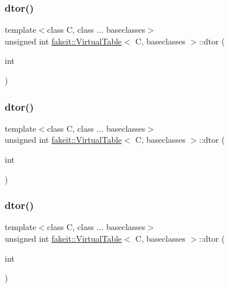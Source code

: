 \subsubsection{\texorpdfstring{dtor()}{dtor()}\hspace{0.1cm}{\footnotesize\ttfamily [6/10]}}
{\footnotesize\ttfamily template$<$class C, class ... baseclasses$>$ \\
unsigned int \mbox{\hyperlink{structfakeit_1_1VirtualTable}{fakeit\+::\+Virtual\+Table}}$<$ C, baseclasses $>$\+::dtor (\begin{DoxyParamCaption}\item[{int}]{ }\end{DoxyParamCaption})\hspace{0.3cm}{\ttfamily [inline]}}

\mbox{\label{structfakeit_1_1VirtualTable_a7be0619d713b6ae2cac5722895176a14}} 
\subsubsection{\texorpdfstring{dtor()}{dtor()}\hspace{0.1cm}{\footnotesize\ttfamily [7/10]}}
{\footnotesize\ttfamily template$<$class C, class ... baseclasses$>$ \\
unsigned int \mbox{\hyperlink{structfakeit_1_1VirtualTable}{fakeit\+::\+Virtual\+Table}}$<$ C, baseclasses $>$\+::dtor (\begin{DoxyParamCaption}\item[{int}]{ }\end{DoxyParamCaption})\hspace{0.3cm}{\ttfamily [inline]}}

\mbox{\label{structfakeit_1_1VirtualTable_a7be0619d713b6ae2cac5722895176a14}} 
\subsubsection{\texorpdfstring{dtor()}{dtor()}\hspace{0.1cm}{\footnotesize\ttfamily [8/10]}}
{\footnotesize\ttfamily template$<$class C, class ... baseclasses$>$ \\
unsigned int \mbox{\hyperlink{structfakeit_1_1VirtualTable}{fakeit\+::\+Virtual\+Table}}$<$ C, baseclasses $>$\+::dtor (\begin{DoxyParamCaption}\item[{int}]{ }\end{DoxyParamCaption})\hspace{0.3cm}{\ttfamily [inline]}}

